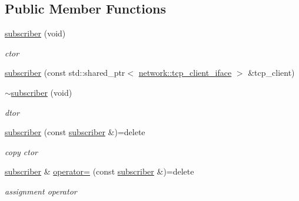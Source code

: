 \subsection*{Public Member Functions}
\begin{DoxyCompactItemize}
\item 
\mbox{\label{classcpp__redis_1_1subscriber_ab7feafca57399394e3a1a0d6daf52770}} 
\hyperlink{classcpp__redis_1_1subscriber_ab7feafca57399394e3a1a0d6daf52770}{subscriber} (void)
\begin{DoxyCompactList}\small\item\em ctor \end{DoxyCompactList}\item 
\hyperlink{classcpp__redis_1_1subscriber_a66136601f44564842e2c67de2da199af}{subscriber} (const std\+::shared\+\_\+ptr$<$ \hyperlink{classcpp__redis_1_1network_1_1tcp__client__iface}{network\+::tcp\+\_\+client\+\_\+iface} $>$ \&tcp\+\_\+client)
\item 
\mbox{\label{classcpp__redis_1_1subscriber_a878caeb144b11de30466a380b09abc30}} 
\hyperlink{classcpp__redis_1_1subscriber_a878caeb144b11de30466a380b09abc30}{$\sim$subscriber} (void)
\begin{DoxyCompactList}\small\item\em dtor \end{DoxyCompactList}\item 
\mbox{\label{classcpp__redis_1_1subscriber_af5f11532bf727eeb2d4a926bdc775cd7}} 
\hyperlink{classcpp__redis_1_1subscriber_af5f11532bf727eeb2d4a926bdc775cd7}{subscriber} (const \hyperlink{classcpp__redis_1_1subscriber}{subscriber} \&)=delete
\begin{DoxyCompactList}\small\item\em copy ctor \end{DoxyCompactList}\item 
\mbox{\label{classcpp__redis_1_1subscriber_ac60f83e6e915073bda6853baaeb39485}} 
\hyperlink{classcpp__redis_1_1subscriber}{subscriber} \& \hyperlink{classcpp__redis_1_1subscriber_ac60f83e6e915073bda6853baaeb39485}{operator=} (const \hyperlink{classcpp__redis_1_1subscriber}{subscriber} \&)=delete
\begin{DoxyCompactList}\small\item\em assignment operator \end{DoxyCompactList}\item 

\end{DoxyCompactItemize}
